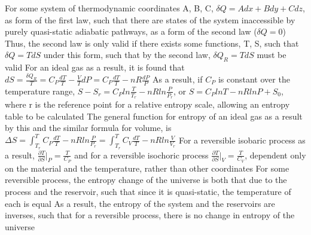 \documentclass[11 pt, twoside]{article}
\newenvironment{outline*}
{
	\begin{outline}[enumerate]
	}
	{\end{outline}
}
\begin{document}
\begin{outline*}
\2 For some system of thermodynamic coordinates A, B, C, $\delta Q = Adx + Bdy + Cdz$, as form of the first law, such that there are states of the system inaccessible by purely quasi-static adiabatic pathways, as a form of the second law ($\delta Q = 0$)
\3 Thus, the second law is only valid if there exists some functions, T, S, such that $\delta Q = TdS$ under this form, such that by the second law, $\delta Q_R = TdS$ must be valid
\1 For an ideal gas as a result, it is found that $dS = \frac{\delta Q_R}{T} = C_P\frac{dT}{T} - \frac{V}{T}dP = C_P \frac{dT}{T} - nR\frac{dP}{P}$
\2 As a result, if $C_P$ is constant over the temperature range, $S - S_r = C_P ln\frac{T}{T_r} - nR ln\frac{P}{P_r}$, or $S = C_PlnT - nRlnP + S_0$, where r is the reference point for a relative entropy scale, allowing an entropy table to be calculated
\2 The general function for entropy of an ideal gas as a result by this and the similar formula for volume, is $\Delta S = \int^T_{T_r}C_P \frac{dT}{T} - nR ln\frac{P}{P_r} = \int^T_{T_r}C_V \frac{dT}{T} - nR ln\frac{V}{V_r}$ 
\3 For a reversible isobaric process as a result, $\frac{\partial T}{\partial S}|_P = \frac{T}{C_P}$ and for a reversible isochoric process $\frac{\partial T}{\partial S}|_V = \frac{T}{C_V}$, dependent only on the material and the temperature, rather than other coordinates
\1 For some reversible process, the entropy change of the universe is both that due to the process and the reservoir, such that since it is quasi-static, the temperature of each is equal
\2 As a result, the entropy of the system and the reservoirs are inverses, such that for a reversible process, there is no change in entropy of the universe
\end{outline*}
\end{document}
